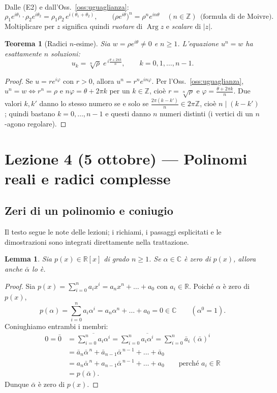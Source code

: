 \documentclass[11pt,a4paper]{article}
\newcommand{\RR}{\mathbb{R}}
\newcommand{\CC}{\mathbb{C}}
\newcommand{\ZZ}{\mathbb{Z}}
\newcommand{\Arg}{\operatorname{Arg}}
\theoremstyle{plain}
\newtheorem{lemma}[prop]{Lemma}
\newtheorem{teo}[prop]{Teorema}
\theoremstyle{definition}
\theoremstyle{remark}
\begin{document}
Dalle (E2) e dall'Oss.~\ref{oss:uguaglianza}:
\[
  \rho_1e^{i\theta_1}\cdot\rho_2e^{i\theta_2}=\rho_1\rho_2\,e^{i(\theta_1+\theta_2)},\qquad
  \bigl(\rho e^{i\theta}\bigr)^n=\rho^n e^{in\theta}\quad(n\in\ZZ)\ \ \text{(formula di de Moivre)}.
\]
Moltiplicare per $z$ significa quindi \emph{ruotare} di $\Arg z$ e \emph{scalare} di $|z|$.

\begin{teo}[Radici $n$-esime]\label{teo:radici}
Sia $w=\rho e^{i\theta}\neq0$ e $n\ge1$. L'equazione $u^n=w$ ha esattamente $n$ soluzioni:
\[
  u_k=\sqrt[n]{\rho}\;e^{\,i\frac{\theta+2\pi k}{n}},\qquad k=0,1,\dots,n-1 .
\]
\end{teo}
\begin{proof}
Se $u=re^{i\varphi}$ con $r>0$, allora $u^n=r^ne^{in\varphi}$. Per l'Oss.~\ref{oss:uguaglianza},
$u^n=w\iff r^n=\rho$ e $n\varphi=\theta+2\pi k$ per un $k\in\ZZ$, cioè $r=\sqrt[n]\rho$ e $\varphi=\frac{\theta+2\pi k}{n}$.
Due valori $k,k'$ danno lo stesso numero se e solo se $\frac{2\pi(k-k')}{n}\in2\pi\ZZ$, cioè $n\mid(k-k')$;
quindi bastano $k=0,\dots,n-1$ e questi danno $n$ numeri distinti (i vertici di un $n$-agono regolare).
\end{proof}
\par\medskip

\section{Lezione 4 (5 ottobre) --- Polinomi reali e radici complesse}

\subsection{Zeri di un polinomio e coniugio}

Il testo segue le note delle lezioni; i richiami, i passaggi esplicitati e le dimostrazioni sono integrati direttamente nella trattazione.


\begin{lemma}\label{lemma:coniugato}
Sia $p(x)\in\RR[x]$ di grado $n\ge1$. Se $\alpha\in\CC$ è zero di $p(x)$, allora anche $\bar\alpha$ lo è.
\end{lemma}

\begin{proof}
Sia $p(x)=\sum_{i=0}^na_ix^i=a_nx^n+\dots+a_0$ con $a_i\in\RR$. Poiché $\alpha$ è zero di $p(x)$,
\[
  p(\alpha)=\sum_{i=0}^na_i\alpha^i=a_n\alpha^n+\dots+a_0=0\in\CC\qquad(\alpha^0=1).
\]
Coniughiamo entrambi i membri:
\begin{align*}
  0=\bar0&=\overline{\sum_{i=0}^na_i\alpha^i}=\sum_{i=0}^n\overline{a_i\alpha^i}=\sum_{i=0}^n\bar a_i\,(\bar\alpha)^i\\
  &=\bar a_n\bar\alpha^{\,n}+\bar a_{n-1}\bar\alpha^{\,n-1}+\dots+\bar a_0\\
  &=a_n\bar\alpha^{\,n}+a_{n-1}\bar\alpha^{\,n-1}+\dots+a_0\qquad\text{perché }a_i\in\RR\\
  &=p(\bar\alpha).
\end{align*}
Dunque $\bar\alpha$ è zero di $p(x)$.
\end{proof}
\end{document}
